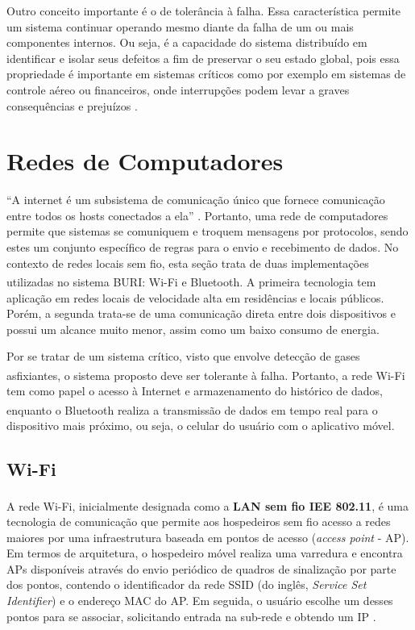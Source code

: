 Outro conceito importante é o de tolerância à falha. Essa característica permite um sistema continuar operando mesmo diante da falha de um ou mais 
componentes internos. Ou seja, é a capacidade do sistema distribuído em identificar e isolar seus defeitos a fim de preservar o seu estado global, pois essa propriedade é 
importante em sistemas críticos como por exemplo em sistemas de controle aéreo ou financeiros, onde interrupções podem levar a graves consequências e prejuízos \cite[pp. 528]{sistemas-distribuidos-coulouris2013}.

\section{Redes de Computadores}

``A internet é um subsistema de comunicação único que fornece comunicação entre todos os hosts conectados a ela'' \cite[pp. 96]{sistemas-distribuidos-coulouris2013}. Portanto, uma rede de computadores 
permite que sistemas se comuniquem e troquem mensagens por protocolos, sendo estes um conjunto específico de regras para o envio e recebimento de dados. No contexto de redes locais sem fio, esta seção trata de duas 
implementações utilizadas no sistema BURI: Wi-Fi\textsuperscript{\textregistered} e Bluetooth\textsuperscript{\textregistered}. A primeira tecnologia tem aplicação em redes locais de velocidade alta em residências e locais públicos. Porém, a segunda trata-se de uma comunicação direta entre dois 
dispositivos e possui um alcance muito menor, assim como um baixo consumo de energia.

Por se tratar de um sistema crítico, visto que envolve detecção de gases asfixiantes, o sistema proposto deve ser tolerante à falha. Portanto, a rede Wi-Fi\textsuperscript{\textregistered} tem como papel o acesso à Internet e armazenamento do histórico de dados, enquanto o 
Bluetooth\textsuperscript{\textregistered} realiza a transmissão de dados em tempo real para o dispositivo mais próximo, ou seja, o celular do usuário com o aplicativo móvel.

\subsection{Wi-Fi}

A rede Wi-Fi\textsuperscript{\textregistered}, inicialmente designada como a \textbf{LAN sem fio IEE 802.11}, é uma tecnologia de comunicação 
que permite aos hospedeiros sem fio acesso a redes maiores por uma infraestrutura baseada em pontos de acesso (\textit{access point} - AP). Em termos 
de arquitetura, o hospedeiro móvel realiza uma varredura e encontra APs disponíveis através do envio periódico de quadros de sinalização por parte dos pontos, contendo o identificador da 
rede SSID (do inglês, \textit{Service Set Identifier}) e o endereço MAC do AP. Em seguida, o usuário escolhe um desses pontos para 
se associar, solicitando entrada na sub-rede e obtendo um IP \cite{redeskurose2010}. 

